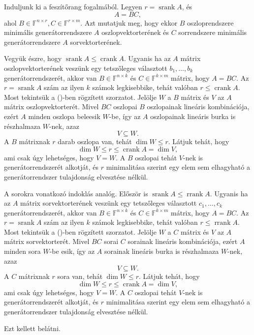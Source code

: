 \documentclass[9pt,showtrims]{memoir}
\makeatletter
\renewenvironment{proof}[1][\proofname]
    {\par\pushQED{\qed}%
    \normalfont \topsep6\p@\@plus6\p@\relax
    \trivlist
    \item[\hskip\labelsep
        \itshape
    #1\@addpunct{:}]\ignorespaces}
    {\popQED\endtrivlist\@endpefalse}
\theoremstyle{plain}
\theoremstyle{remark}
\theoremstyle{definition}
\renewcommand{\mathbf}{\mathbb}
\DeclareMathOperator{\crank}{crank}
\DeclareMathOperator{\rrank}{rrank}
\DeclareMathOperator{\srank}{srank}
\makeatother
\begin{document}
\begin{proof}
    Induljunk ki a feszítőrang fogalmából.
    Legyen $r=\srank{A}$, és 
    \[
        A=BC,\tag{\dag}
    \]
    ahol $B\in\mathbf{F}^{n\times r},C\in\mathbf{F}^{r\times m}$.
    Azt mutatjuk meg, hogy ekkor $B$ oszloprendszere minimális generátorrendszere $A$ oszlopvektorterének
    és $C$ sorrendszere minimális generátorrendszere $A$ sorvektorterének.

    Vegyük észre, hogy $\srank{A}\leq \crank{A}$.
    Ugyanis ha az $A$ mátrix oszlopvektorterének veszünk egy tetszőleges választott
    $b_1,\dots,b_k$ generátorrendszerét, 
    akkor van $B\in\mathbf{F}^{n\times k}$ és $C\in\mathbf{F}^{k\times m}$ mátrix, hogy $A=BC$.
    Az $r=\srank{A}$ szám az ilyen $k$ számok legkisebbike, tehát valóban $r\leq\crank{A}$.
    \\
    Most tekintsük a (\dag)-ben rögzített szorzatot.
    Jelölje $W$ a $B$ mátrix és $V$ az $A$ mátrix oszlopvektorterét.
    Mivel $BC$ oszlopai $B$ oszlopainak lineáris kombinációja, 
    ezért $A$ minden oszlopa beleesik $W$-be, 
    így az $A$ oszlopainak lineáris burka is részhalmaza $W$-nek,
    azaz 
    \[
        V\subseteq W.
    \]
    A $B$ mátrixnak $r$ darab oszlopa van, 
    tehát $\dim W\leq r$.
    Látjuk tehát, hogy 
    \[\dim W\leq r\leq\crank{A}=\dim V,
    \]
    ami csak úgy lehetséges, 
    hogy $V=W$.
    A $B$ oszlopai tehát $V$-nek is generátorrendszerét alkotját,
    és $r$ minimalitása szerint egy elem sem elhagyható a generátorrendszer tulajdonság
    elvesztése nélkül.

    A sorokra vonatkozó indoklás analóg.
    Először is $\srank{A}\leq \rrank{A}$.
    Ugyanis ha az $A$ mátrix sorvektorterének veszünk egy tetszőleges választott
    $c_1,\dots,c_k$ generátorrendszerét, 
    akkor van $B\in\mathbf{F}^{n\times k}$ és $C\in\mathbf{F}^{k\times m}$ mátrix, hogy $A=BC$.
    Az $r=\srank{A}$ szám az ilyen $k$ számok legkisebbike, tehát valóban $r\leq\rrank{A}$.
    \\
    Most tekintsük a (\dag)-ben rögzített szorzatot.
    Jelölje $W$ a $C$ mátrix és $V$ az $A$ mátrix sorvektorterét.
    Mivel $BC$ sorai $C$ sorainak lineáris kombinációja, 
    ezért $A$ minden sora $W$-be esik,
    így az $A$ sorainak lineáris burka is részhalmaza $W$-nek,
    azaz 
    \[
        V\subseteq W.
    \]
    A $C$ mátrixnak $r$ sora van, 
    tehát $\dim W\leq r$.
    Látjuk tehát, hogy 
    \[\dim W\leq r\leq\crank{A}=\dim V,
    \]
    ami csak úgy lehetséges, 
    hogy $V=W$.
    A $C$ oszlopai tehát $V$-nek is generátorrendszerét alkotját,
    és $r$ minimalitása szerint egy elem sem elhagyható a generátorrendszer tulajdonság
    elvesztése nélkül.

    Ezt kellett belátni. 
\end{proof}
\end{document}

